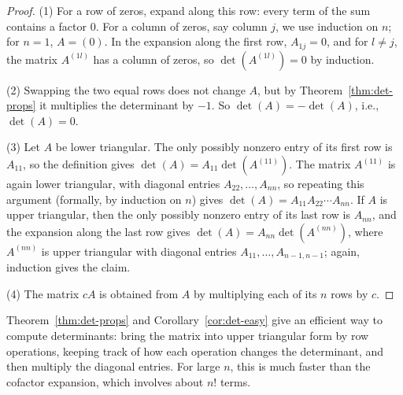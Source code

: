 \documentclass[11pt]{article}
\theoremstyle{definition}
\theoremstyle{plain}
\theoremstyle{remark}
\begin{document}
\begin{proof}
    (1) For a row of zeros, expand along this row: every term of the sum contains a factor $0$. For a column of zeros, say column $j$, we use induction on $n$; for $n = 1$, $A = (0)$. In the expansion along the first row, $A_{1j} = 0$, and for $l \neq j$, the matrix $A^{(1l)}$ has a column of zeros, so $\det(A^{(1l)}) = 0$ by induction.

    (2) Swapping the two equal rows does not change $A$, but by Theorem~\ref{thm:det-props} it multiplies the determinant by $-1$. So $\det(A) = -\det(A)$, i.e., $\det(A) = 0$.

    (3) Let $A$ be lower triangular. The only possibly nonzero entry of its first row is $A_{11}$, so the definition gives $\det(A) = A_{11} \det(A^{(11)})$. The matrix $A^{(11)}$ is again lower triangular, with diagonal entries $A_{22}, \ldots, A_{nn}$, so repeating this argument (formally, by induction on $n$) gives $\det(A) = A_{11} A_{22} \cdots A_{nn}$. If $A$ is upper triangular, then the only possibly nonzero entry of its last row is $A_{nn}$, and the expansion along the last row gives $\det(A) = A_{nn}\det(A^{(nn)})$, where $A^{(nn)}$ is upper triangular with diagonal entries $A_{11}, \ldots, A_{n-1,n-1}$; again, induction gives the claim.

    (4) The matrix $cA$ is obtained from $A$ by multiplying each of its $n$ rows by $c$.
\end{proof}

Theorem~\ref{thm:det-props} and Corollary~\ref{cor:det-easy} give an efficient way to compute determinants: bring the matrix into upper triangular form by row operations, keeping track of how each operation changes the determinant, and then multiply the diagonal entries. For large $n$, this is much faster than the cofactor expansion, which involves about $n!$ terms.
\end{document}
